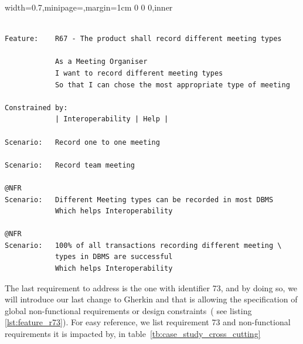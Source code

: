 \documentclass[dissertation,final]{softeng}
\newcommand{\nfrs}{non-functional requirements\xspace}
\newenvironment{featurecode}[1]
{ \lrbox\featurebox \begin{adjustbox}{width=#1\textwidth,minipage=\textwidth,margin=1cm 0 0 0,inner} }
{ \end{adjustbox}\endlrbox}
\newenvironment{featurelist}[2]
{
\newcommand{\setcaption}{\caption{#1}}
\newcommand{\setlabel}{\label{#2}}
}
{\begin{listing}[h!]\centering\usebox\featurebox\setcaption\setlabel\end{listing}}
\begin{document}
\begin{featurelist}{Changes to Gherkin -- R67 -- The product shall record different meeting types}{lst:feature_r67}
\begin{featurecode}{0.7}
\begin{verbatim}

Feature:    R67 - The product shall record different meeting types

            As a Meeting Organiser
            I want to record different meeting types
            So that I can chose the most appropriate type of meeting
	
Constrained by:
            | Interoperability | Help |

Scenario:   Record one to one meeting

Scenario:   Record team meeting
	
@NFR	
Scenario:   Different Meeting types can be recorded in most DBMS
            Which helps Interoperability

@NFR
Scenario:   100% of all transactions recording different meeting \
            types in DBMS are successful
            Which helps Interoperability
\end{verbatim}
\end{featurecode}
\end{featurelist}

The last requirement to address is the one with identifier 73, and by doing so, we will introduce our last change to Gherkin and that is allowing the specification of global \nfrs or design constraints~( see listing \ref{lst:feature_r73}). For easy reference, we list requirement 73 and \nfrs it is impacted by, in table~\ref{tb:case_study_cross_cutting}

\begin{table}[h!]
\caption[Cross-cutting \nfrs]{Cross-cutting \nfrs}
\label{tb:case_study_cross_cutting}
\setlength{\extrarowheight}{1.8pt}
\centering
{}
\end{table}
\end{document}
